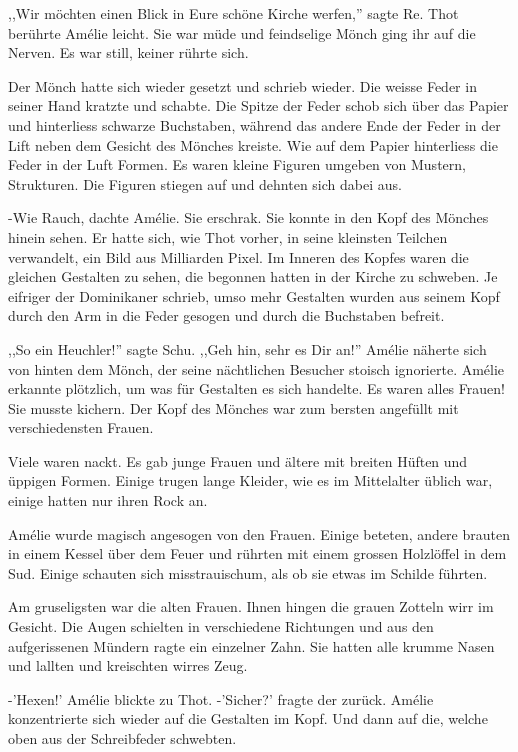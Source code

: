 \documentclass[11pt,titlepage,a5paper]{book}
\begin{document}
,,Wir möchten einen Blick in Eure schöne Kirche werfen,'' sagte Re. Thot berührte Amélie leicht. Sie war müde und feindselige Mönch ging ihr auf die Nerven. Es war still, keiner rührte sich.

Der Mönch hatte sich wieder gesetzt und schrieb wieder. Die weisse Feder in seiner Hand kratzte und schabte. Die Spitze der Feder schob sich über das Papier und hinterliess schwarze Buchstaben, während das andere Ende der Feder in der Lift neben dem Gesicht des Mönches kreiste. Wie auf dem Papier hinterliess die Feder in der Luft Formen. Es waren kleine Figuren umgeben von Mustern, Strukturen. Die Figuren stiegen auf und dehnten sich dabei aus. 

-Wie Rauch, dachte Amélie. Sie erschrak. Sie konnte in den Kopf des Mönches hinein sehen. Er hatte sich, wie Thot vorher, in seine kleinsten Teilchen verwandelt, ein Bild aus Milliarden Pixel. Im Inneren des Kopfes waren die gleichen Gestalten zu sehen, die begonnen hatten in der Kirche zu schweben. Je eifriger der Dominikaner schrieb, umso mehr Gestalten wurden aus seinem Kopf durch den Arm in die Feder gesogen und durch die Buchstaben befreit.

,,So ein Heuchler!'' sagte Schu. ,,Geh hin, sehr es Dir an!'' Amélie näherte sich von hinten dem Mönch, der seine nächtlichen Besucher stoisch ignorierte. Amélie erkannte plötzlich, um was für Gestalten es sich handelte. Es waren alles Frauen! Sie musste kichern. Der Kopf des Mönches war zum bersten angefüllt mit verschiedensten Frauen.

Viele waren nackt. Es gab junge Frauen und ältere mit breiten Hüften und üppigen Formen. Einige trugen lange Kleider, wie es im Mittelalter üblich war, einige hatten nur ihren Rock an. 

Amélie wurde magisch angesogen von den Frauen. Einige beteten, andere brauten in einem Kessel über dem Feuer und rührten mit einem grossen Holzlöffel in dem Sud. Einige schauten sich misstrauischum, als ob sie etwas im Schilde führten. 

Am gruseligsten war die alten Frauen. Ihnen hingen die grauen Zotteln wirr im Gesicht. Die Augen schielten in verschiedene Richtungen und aus den aufgerissenen Mündern ragte ein einzelner Zahn. Sie hatten alle krumme Nasen und lallten und kreischten wirres Zeug. 

-'Hexen!' Amélie blickte zu Thot. -'Sicher?' fragte der zurück. Amélie konzentrierte sich wieder auf die Gestalten im Kopf. Und dann auf die, welche oben aus der Schreibfeder schwebten.
\end{document}
